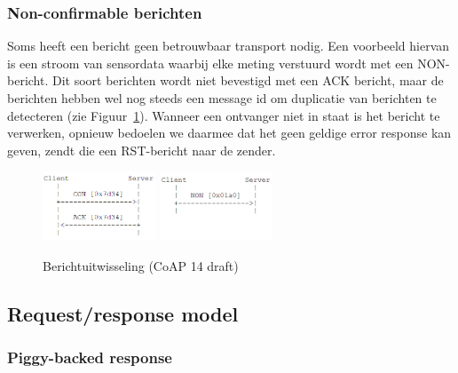 \subsubsection{Non-confirmable berichten}

Soms heeft een bericht geen betrouwbaar transport nodig. Een voorbeeld hiervan is een stroom van sensordata waarbij elke meting verstuurd wordt met een NON-bericht. Dit soort berichten wordt niet bevestigd met een ACK bericht, maar de berichten hebben wel nog steeds een message id om duplicatie van berichten te detecteren (zie Figuur~\ref{fig:berichtuitwisseling}). Wanneer een ontvanger niet in staat is het bericht te verwerken, opnieuw bedoelen we daarmee dat het geen geldige error response kan geven, zendt die een RST-bericht naar de zender.

\begin{figure}[h]
\vspace{10pt}
\centering
{}
{\includegraphics[width=0.3\textwidth]{fig/CoAPConfirmable}}
\hspace{30pt}
{\includegraphics[width=0.3\textwidth]{fig/CoAPNonConfirmable}}
\caption{Berichtuitwisseling (CoAP 14 draft)}
\label{fig:berichtuitwisseling}
\end{figure}

\subsection{Request/response model}

\subsubsection{Piggy-backed response}


